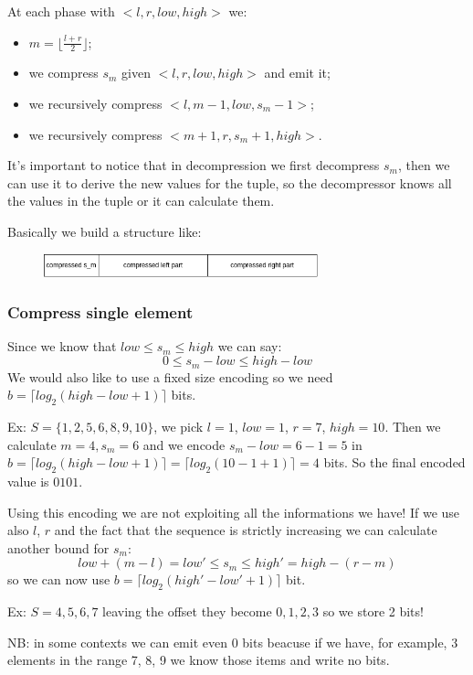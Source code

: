 At each phase with $<l, r, low, high>$ we:
\begin{itemize}
    \item $m = \lfloor \frac{l+r}{2} \rfloor$;
    \item we compress $s_m$ given $<l, r, low, high>$ and emit it;
    \item we recursively compress $<l, m-1, low, s_m-1>$;
    \item we recursively compress $<m+1, r, s_m+1, high>$.
\end{itemize}
It's important to notice that in decompression we first decompress $s_m$, then we can use it to derive the new values for the tuple, so the decompressor knows all the values in the tuple or it can calculate them.

Basically we build a structure like:
\begin{figure}[H]
    \centering
    \includegraphics[width=300px]{images/10_Data_compression/interpolative_coding.png}
\end{figure}

\subsubsection{Compress single element}
Since we know that $low \leq s_m \leq high$ we can say:
$$
    0 \leq s_m - low \leq high-low
$$
We would also like to use a fixed size encoding so we need $b = \lceil log_2 (high-low+1) \rceil$ bits.

Ex: $S = \{1, 2, 5, 6, 8, 9, 10\}$, we pick $l=1$, $low=1$, $r = 7$, $high=10$.
Then we calculate $m = 4, s_m = 6$ and we encode $s_m - low = 6-1=5$ in $b = \lceil log_2 (high-low+1) \rceil = \lceil log_2 (10-1+1) \rceil = 4$ bits.
So the final encoded value is $0101$.

Using this encoding we are not exploiting all the informations we have!
If we use also $l$, $r$ and the fact that the sequence is strictly increasing we can calculate another bound for $s_m$: 
$$
    low + (m-l) = low' \leq s_m \leq high' = high - (r-m)
$$
so we can now use $b = \lceil log_2 (high' - low' + 1) \rceil$ bit.

Ex: $S = 4, 5, 6, 7$ leaving the offset they become $0, 1, 2, 3$ so we store 2 bits!

NB: in some contexts we can emit even 0 bits beacuse if we have, for example, 3 elements in the range 7, 8, 9 we know those items and write no bits.

